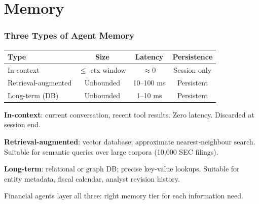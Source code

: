 \documentclass[9pt,t]{beamer}
\begin{document}
\section{Memory}

\begin{frame}
\frametitle{Three Types of Agent Memory}

\begin{center}
\begin{tabular}{lccc}
\toprule
\textbf{Type} & \textbf{Size} & \textbf{Latency} & \textbf{Persistence} \\
\midrule
In-context & $\leq$ ctx window & $\approx 0$ & Session only \\
Retrieval-augmented & Unbounded & 10--100 ms & Persistent \\
Long-term (DB) & Unbounded & 1--10 ms & Persistent \\
\bottomrule
\end{tabular}
\end{center}

\medskip
\textbf{In-context}: current conversation, recent tool results. Zero latency. Discarded at session end.

\textbf{Retrieval-augmented}: vector database; approximate nearest-neighbour search. Suitable for semantic queries over large corpora (10,000 SEC filings).

\textbf{Long-term}: relational or graph DB; precise key-value lookups. Suitable for entity metadata, fiscal calendar, analyst revision history.

\medskip
Financial agents layer all three: right memory tier for each information need.
\end{frame}
\end{document}
